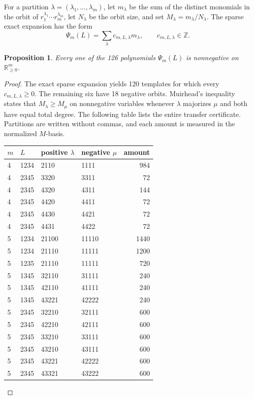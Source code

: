 \documentclass[11pt]{article}
\newtheorem{proposition}[theorem]{Proposition}
\begin{document}
For a partition $\lambda=(\lambda_1,\ldots,\lambda_m)$, let $m_\lambda$ be
the sum of the distinct monomials in the orbit of
$r_1^{\lambda_1}\cdots r_m^{\lambda_m}$, let $N_\lambda$ be the orbit size,
and set $M_\lambda=m_\lambda/N_\lambda$.  The sparse exact expansion has the
form
\[
 \Psi_m(L)=\sum_\lambda c_{m,L,\lambda}m_\lambda,
 \qquad c_{m,L,\lambda}\in\mathbb Z.
\]

\begin{proposition}\label{prop:signs}
Every one of the 126 polynomials $\Psi_m(L)$ is nonnegative on
$\mathbb R_{\geq0}^m$.
\end{proposition}

\begin{proof}
The exact sparse expansion yields 120 templates for which every
$c_{m,L,\lambda}\geq0$.  The remaining six have 18 negative orbits.
Muirhead's inequality \cite{Muirhead1902} states that
$M_\lambda\geq M_\mu$ on nonnegative variables whenever $\lambda$ majorizes
$\mu$ and both have equal total degree.  The following table lists the entire
transfer certificate.  Partitions are written without commas, and each amount
is measured in the normalized $M$-basis.

\begin{center}
\small
\begin{tabular}{llllr}
\toprule
$m$ & $L$ & positive $\lambda$ & negative $\mu$ & amount\\
\midrule
4&1234&2110&1111&984\\
4&2345&3320&3311&72\\
4&2345&4320&4311&144\\
4&2345&4420&4411&72\\
4&2345&4430&4421&72\\
4&2345&4431&4422&72\\
5&1234&21100&11110&1440\\
5&1234&21110&11111&1200\\
5&1235&21110&11111&720\\
5&1345&32110&31111&240\\
5&1345&42110&41111&240\\
5&1345&43221&42222&240\\
5&2345&32210&32111&600\\
5&2345&42210&42111&600\\
5&2345&33210&33111&600\\
5&2345&43210&43111&600\\
5&2345&43221&42222&600\\
5&2345&43321&43222&600\\
\bottomrule
\end{tabular}
\end{center}


\end{proof}
\end{document}
